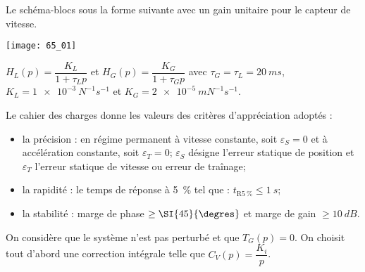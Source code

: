 \normaltrue \difficilefalse \tdifficilefalse
\correctionfalse

\setcounter{question}{0}%


\ifcorrection
\else
{}
\fi

\ifprof
\else
Le schéma-blocs sous la forme suivante avec un gain unitaire pour le capteur
de vitesse.

\begin{marginfigure}
\texttt{[image: 65\_01]}
\end{marginfigure}

$H_L(p)=\dfrac{K_L}{1+\tau_L p}$ et $H_G(p)=\dfrac{K_G}{1+\tau_G p}$  avec $\tau_G=\tau_L = \SI{20}{ms}$, $K_L = \SI{1e-3}{N^{-1}s^{-1}}$ et $K_G = \SI{2e-5}{mN^{-1}s^{-1}}$.


Le cahier des charges donne les valeurs des critères d'appréciation adoptés :
\begin{itemize}
\item la précision : en régime permanent à vitesse constante, soit $\varepsilon_S=0$ et à accélération constante, soit $\varepsilon_T=0$; $\varepsilon_S$ désigne l'erreur statique de position et $\varepsilon_T$ l'erreur statique de vitesse ou erreur de traînage;
\item la rapidité : le temps de réponse à \SI{5}{\%} tel que : $t_{\text{R}\SI{5}{\%}}\leq \SI{1}{s}$;
\item la stabilité : marge de phase $\geq \SI{45}{\degres}$ et marge de gain $\geq \SI{10}{dB}$.
\end{itemize}

On considère que le système n'est pas perturbé et que $T_G(p)=0$.
On choisit tout d'abord une correction intégrale telle que $C_V(p)=\dfrac{K_i}{p}$.
\fi

\ifprof
\else 
\fi

\ifprof
\else 
\fi


